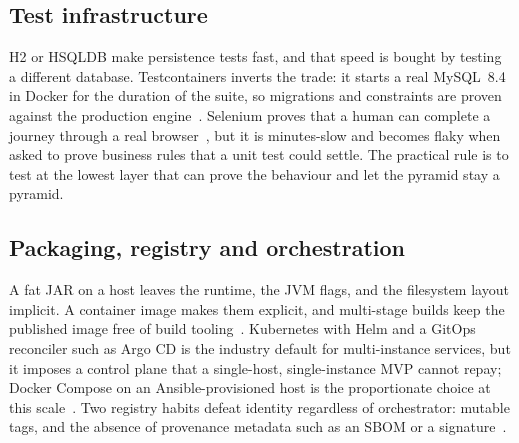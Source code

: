 \documentclass[10pt,a4paper]{article}
\begin{document}
\subsection{Test infrastructure}
H2 or HSQLDB make persistence tests fast, and that speed is bought by testing a different
database. Testcontainers inverts the trade: it starts a real MySQL~8.4 in Docker for the duration
of the suite, so migrations and constraints are proven against the production
engine~\cite{testcontainers}. Selenium proves that a human can complete a journey through a real
browser~\cite{selenium}, but it is minutes-slow and becomes flaky when asked to prove business
rules that a unit test could settle. The practical rule is to test at the lowest layer that can
prove the behaviour and let the pyramid stay a pyramid.

\subsection{Packaging, registry and orchestration}
A fat JAR on a host leaves the runtime, the JVM flags, and the filesystem layout implicit. A
container image makes them explicit, and multi-stage builds keep the published image free of
build tooling~\cite{dockermulti}. Kubernetes with Helm and a GitOps reconciler such as Argo CD is
the industry default for multi-instance services, but it imposes a control plane that a
single-host, single-instance MVP cannot repay; Docker Compose on an Ansible-provisioned host is
the proportionate choice at this scale~\cite{ansible}. Two registry habits defeat identity
regardless of orchestrator: mutable tags, and the absence of provenance metadata such as an SBOM
or a signature~\cite{ociimage,slsa}.
\end{document}
